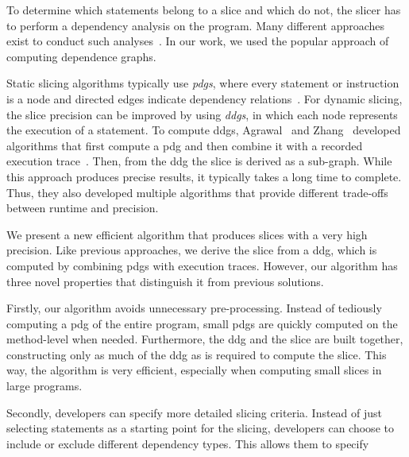 To determine which statements belong to a slice and which do not, the slicer has to perform a dependency analysis on the program.
Many different approaches exist to conduct such analyses~\cite{korel_98_dynamic_program_slicing_methods, tip_94_a_survey_of_program}. 
In our work, we used the popular approach of computing dependence graphs.

Static slicing algorithms typically use \emph{\acp{pdg}}, where every statement or instruction is a node and directed edges indicate dependency relations~\cite{weiser_81_program_slicing}.
For dynamic slicing, the slice precision can be improved by using \emph{\acp{ddg}}, in which each node represents the execution of a statement.
To compute \acp{ddg}, Agrawal \etal\ and Zhang \etal\ developed algorithms that first compute a \ac{pdg} and then combine it with a recorded execution trace~\cite{agrawal_90_dynamic_program_slicing,zhang_03_precise_dynamic_slicing_algorithms}.
Then, from the \ac{ddg} the slice is derived as a sub-graph.
While this approach produces precise results, it typically takes a long time to complete.
Thus, they also developed multiple algorithms that provide different trade-offs between runtime and precision.

We present a new efficient algorithm that produces slices with a very high precision.
Like previous approaches, we derive the slice from a \ac{ddg}, which is computed by combining \acp{pdg} with execution traces.
However, our algorithm has three novel properties that distinguish it from previous solutions.

Firstly, our algorithm avoids unnecessary pre-processing.
Instead of tediously computing a \ac{pdg} of the entire program, small \acp{pdg} are quickly computed on the method-level when needed.
Furthermore, the \ac{ddg} and the slice are built together, constructing only as much of the \ac{ddg} as is required to compute the slice.
This way, the algorithm is very efficient, especially when computing small slices in large programs.

Secondly, developers can specify more detailed slicing criteria.
Instead of just selecting statements as a starting point for the slicing, developers can choose to include or exclude different dependency types.
This allows them to specify 

%



